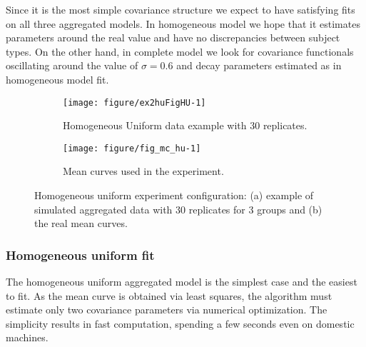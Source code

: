 Since it is the most simple covariance  structure we expect to have satisfying fits on all three aggregated models. In homogeneous model we hope that it estimates parameters around the  real value and have no discrepancies between subject types. On the other hand, in complete model we look for covariance functionals oscillating around the value of $\sigma = 0.6$ and decay parameters estimated as in homogeneous model fit.




\begin{figure}[t]
  \begin{subfigure}{\textwidth}
  \centering
\begin{knitrout}
\color{fgcolor}
\texttt{[image: figure/ex2huFigHU-1]} 

\end{knitrout}
  \caption{Homogeneous Uniform data example with 30 replicates.}
  \label{fig:hu-data}
\end{subfigure}
  \begin{subfigure}{\textwidth}
    \centering
\begin{knitrout}
\color{fgcolor}
\texttt{[image: figure/fig\_mc\_hu-1]} 

\end{knitrout}
    \caption{Mean curves used in the experiment.}
    \label{fig:hu-mc}
  \end{subfigure}
\caption{Homogeneous uniform experiment configuration: (a) example of simulated aggregated data with 30 replicates for 3 groups and (b) the real mean curves.}
\end{figure}


\subsubsection{Homogeneous uniform fit}
\label{sec:mpc2hu}


The homogeneous uniform aggregated model is the simplest case and the easiest to fit. As the mean curve is obtained via least squares, the algorithm must estimate only two covariance parameters via numerical optimization. The simplicity results in fast computation, spending a few seconds even on domestic machines.

